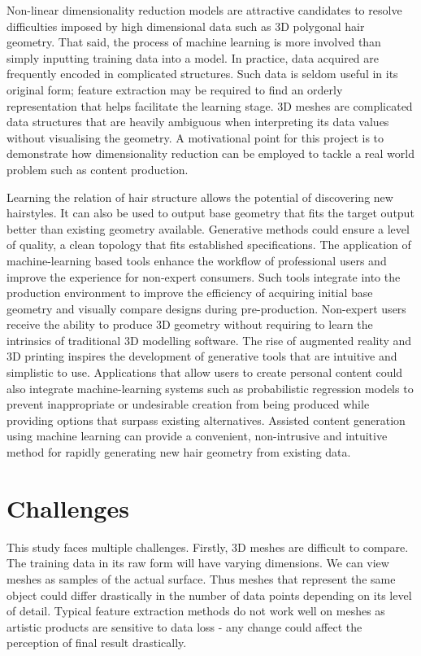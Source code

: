 \documentclass[ %
author={Dillon Keith Diep},
supervisor={Dr. Carl Henrik Ek},
degree={MEng},
title={ART-CG:},
subtitle={Assisted Real-time Content Generation of 3D Hair by Learning Manifolds},
type={Research},
year={2017} ]{dissertation}
\begin{document}
Non-linear dimensionality reduction models are attractive candidates to resolve difficulties imposed by high dimensional data such as 3D polygonal hair geometry. That said, the process of machine learning is more involved than simply inputting training data into a model. In practice, data acquired are frequently encoded in complicated structures. Such data is seldom useful in its original form; feature extraction may be required to find an orderly representation that helps facilitate the learning stage. 3D meshes are complicated data structures that are heavily ambiguous when interpreting its data values without visualising the geometry. A motivational point for this project is to demonstrate how dimensionality reduction can be employed to tackle a real world problem such as content production.

Learning the relation of hair structure allows the potential of discovering new hairstyles.  It can also be used to output base geometry that fits the target output better than existing geometry available. Generative methods could ensure a level of quality, a clean topology that fits established specifications. The application of machine-learning based tools enhance the workflow of professional users and improve the experience for non-expert consumers. Such tools integrate into the production environment to improve the efficiency of acquiring initial base geometry and visually compare designs during pre-production. Non-expert users receive the ability to produce 3D geometry without requiring to learn the intrinsics of traditional 3D modelling software. The rise of augmented reality and 3D printing inspires the development of generative tools that are intuitive and simplistic to use. Applications that allow users to create personal content could also integrate machine-learning systems such as probabilistic regression models to prevent inappropriate or undesirable creation from being produced while providing options that surpass existing alternatives. Assisted content generation using machine learning can provide a convenient, non-intrusive and intuitive method for rapidly generating new hair geometry from existing data.

\section{Challenges}
This study faces multiple challenges. Firstly, 3D meshes are difficult to compare. The training data in its raw form will have varying dimensions. We can view meshes as samples of the actual surface. Thus meshes that represent the same object could differ drastically in the number of data points depending on its level of detail. Typical feature extraction methods do not work well on meshes as artistic products are sensitive to data loss - any change could affect the perception of final result drastically.
\end{document}
